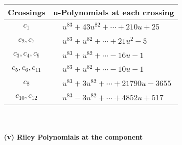\documentclass[1p]{elsarticle_modified}
\theoremstyle{definition}
\begin{document}
\begin{tabular}{m{50pt}|m{274pt}}
Crossings & \hspace{64pt}u-Polynomials at each crossing \\
\hline $$\begin{aligned}c_{1}\end{aligned}$$&$\begin{aligned}
&u^{83}+43 u^{82}+\cdots+210 u+25
\end{aligned}$\\
\hline $$\begin{aligned}c_{2},c_{7}\end{aligned}$$&$\begin{aligned}
&u^{83}+u^{82}+\cdots+21 u^2-5
\end{aligned}$\\
\hline $$\begin{aligned}c_{3},c_{4},c_{9}\end{aligned}$$&$\begin{aligned}
&u^{83}+u^{82}+\cdots-16 u-1
\end{aligned}$\\
\hline $$\begin{aligned}c_{5},c_{6},c_{11}\end{aligned}$$&$\begin{aligned}
&u^{83}+u^{82}+\cdots-10 u-1
\end{aligned}$\\
\hline $$\begin{aligned}c_{8}\end{aligned}$$&$\begin{aligned}
&u^{83}+3 u^{82}+\cdots+21790 u-3655
\end{aligned}$\\
\hline $$\begin{aligned}c_{10},c_{12}\end{aligned}$$&$\begin{aligned}
&u^{83}-3 u^{82}+\cdots+4852 u+517
\end{aligned}$\\
\hline
\end{tabular}\\~\\
\newpage\renewcommand{\arraystretch}{1}
\flushleft \textbf{(v) Riley Polynomials at the component}\newline \\
\end{document}
